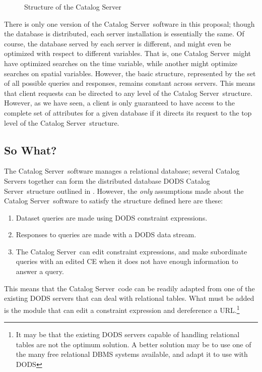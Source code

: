 \documentclass[10pt]{report}
\newcommand{\cs}{Catalog Server}
\begin{document}
\begin{figure}[hp] 
\centerline{}
\caption{Structure of the \cs}
\label{fig:cs-org}
\end{figure}

There is only one version of the \cs\ software in this proposal;
though the database is distributed, each server installation is
essentially the same.  Of course, the database served by each server
is different, and might even be optimized with respect to different
variables.  That is, one \cs\ might have optimized searches on the
time variable, while another might optimize searches on spatial
variables.  However, the basic structure, represented by the set of
all possible queries and responses, remains constant across servers.
This means that client requests can be directed to any level of the
\cs\ structure.  However, as we have seen, a client is only guaranteed
to have access to the complete set of attributes for a given database
if it directs its request to the top level of the \cs\ structure.


\subsection{So What?}

The \cs\ software manages a relational database; several \cs s
together can form the distributed database DODS \cs\ structure
outlined in .  However, the \emph{only}
assumptions made about the \cs\ software to satisfy the structure
defined here are these:

\begin{enumerate}
\item Dataset queries are made using DODS constraint expressions.
\item Responses to queries are made with a DODS data stream.
\item The \cs\ can edit constraint expressions, and make subordinate
  queries with an edited CE when it does not have enough information
  to answer a query.
\end{enumerate}

This means that the \cs\ code can be readily adapted from one of the
existing DODS servers that can deal with relational tables.  What must
be added is the module that can edit a constraint expression and
dereference a URL.\footnote{It may be that the existing DODS servers
  capable of handling relational tables are not the optimum solution.
  A better solution may be to use one of the many free relational
  DBMS systems available, and adapt it to use with DODS}
\end{document}
